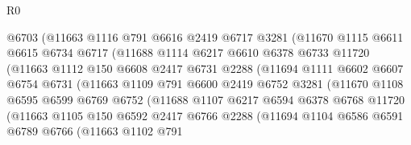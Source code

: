 \begin{lexlean}{R0}
\begin{coremodule}
                    @6703
                    (@11663
                      @1116
                      @791
                      @6616
                      @2419
                      @6717
                      @3281
                      (@11670
                        @1115
                        @6611
                        @6615
                        @6734
                        @6717
                        (@11688
                          @1114
                          @6217
                          @6610
                          @6378
                          @6733
                          @11720
                          (@11663
                            @1112
                            @150
                            @6608
                            @2417
                            @6731
                            @2288
                            (@11694
                              @1111
                              @6602
                              @6607
                              @6754
                              @6731
                              (@11663
                                @1109
                                @791
                                @6600
                                @2419
                                @6752
                                @3281
                                (@11670
                                  @1108
                                  @6595
                                  @6599
                                  @6769
                                  @6752
                                  (@11688
                                    @1107
                                    @6217
                                    @6594
                                    @6378
                                    @6768
                                    @11720
                                    (@11663
                                      @1105
                                      @150
                                      @6592
                                      @2417
                                      @6766
                                      @2288
                                      (@11694
                                        @1104
                                        @6586
                                        @6591
                                        @6789
                                        @6766
                                        (@11663
                                          @1102
                                          @791

\end{coremodule}
\end{lexlean}
